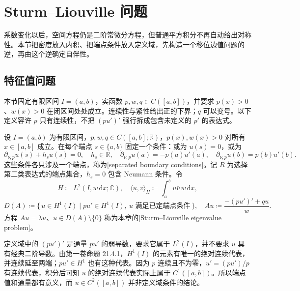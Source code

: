 \section{Sturm–Liouville 问题}
\label{b2:sec:1002}

系数变化以后，空间方程仍是二阶常微分方程，但普通平方积分不再自动给出对称性。本节把密度放入内积、把端点条件放入定义域，先构造一个移位边值问题的逆，再由这个逆确定自伴性。

\subsection{特征值问题}
\label{b2:subsec:100201}

本节固定有限区间 \(I=(a,b)\)，实函数 \(p,w,q\in C([a,b])\)，并要求 \(p(x)>0\)、\(w(x)>0\) 在闭区间处处成立。连续性与紧性给出正的下界；\(q\) 可以变号。以下定义容许 \(p\) 只有连续性，不把 \((pu')'\) 强行拆成包含未定义的 \(p'\) 的表达式。

\begin{definition}\label{b2:def:10-sl-operator}
设 \(I=(a,b)\) 为有限区间，\(p,w,q\in C([a,b];\mathbb R)\)，\(p(x),w(x)>0\) 对所有 \(x\in[a,b]\) 成立。在每个端点 \(s\in\{a,b\}\) 固定一个条件：或为 \(u(s)=0\)，或为
\[
 \partial_{\nu,p}u(s)+h_su(s)=0,
 \quad h_s\in\mathbb R,
 \quad\partial_{\nu,p}u(a)=-p(a)u'(a),
 \quad\partial_{\nu,p}u(b)=p(b)u'(b).
\]
这些条件各只涉及一个端点，称为[separated boundary conditions]。记 \(R\) 为选择第二类表达式的端点集合，\(h_s=0\) 包含 Neumann 条件。令
\[
 H\coloneqq L^2(I,w\,\mathrm{d}x;\mathbb C),
 \quad\langle u,v\rangle_H\coloneqq\int_a^b u\overline v\,w\,\mathrm{d}x,
\]
\[
 D(A)\coloneqq\{\,u\in H^1(I)\mid pu'\in H^1(I),\ u\text{ 满足已定端点条件}\,\},
 \quad Au\coloneqq\dfrac{-(pu')'+qu}{w}.
\]
方程 \(Au=\lambda u\)、\(u\in D(A)\setminus\{0\}\) 称为本章的[Sturm--Liouville eigenvalue problem]。
\end{definition}

定义域中的 \((pu')'\) 是通量 \(pu'\) 的弱导数，要求它属于 \(L^2(I)\)，并不要求 \(u\) 具有经典二阶导数。由第一卷命题 21.4.1，\(H^1(I)\) 的元素有唯一的绝对连续代表，并连续延至两端；\(pu'\in H^1\) 也有这种代表。因为 \(p\) 连续且不为零，\(u'=(pu')/p\) 有连续代表，积分后可知 \(u\) 的绝对连续代表实际上属于 \(C^1([a,b])\)。所以端点值和通量都有意义，而 \(u\in C^2([a,b])\) 并非定义域条件的结论。

